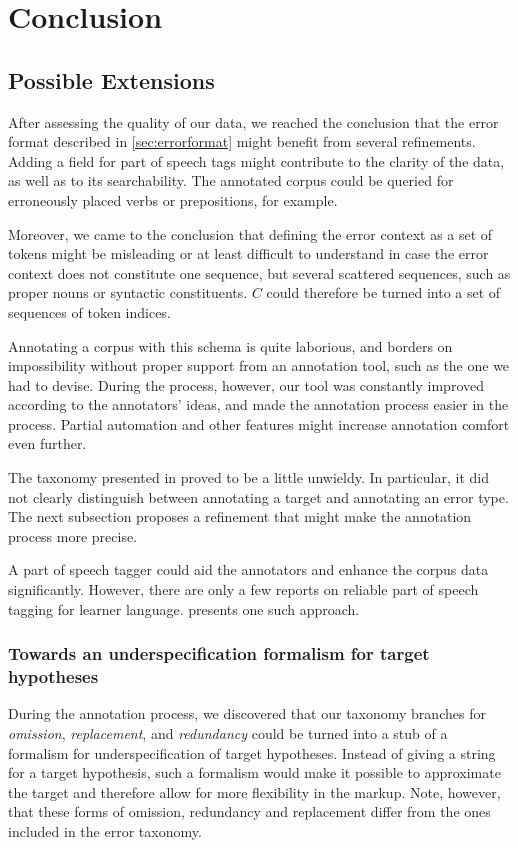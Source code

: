\documentclass[12pt]{article}
\begin{document}
\section{Conclusion}

\subsection{Possible Extensions}

After assessing the quality of our data, we reached
the conclusion that the error format described in \ref{sec:errorformat}
might benefit from several refinements. Adding a field for part of speech tags
might contribute to the clarity of the data, as well as to its searchability.
The annotated corpus could be queried for erroneously placed verbs or
prepositions, for example.

Moreover, we came to the conclusion that defining the error context as a set of
tokens might be misleading or at least difficult to understand in case the error
context does not constitute one sequence, but several scattered sequences, such
as proper nouns or syntactic constituents. $C$ could therefore be turned into a
set of sequences of token indices.

Annotating a corpus with this schema is quite laborious, and borders on
impossibility without proper support from an annotation tool, such as the one we
had to devise. During the process, however, our tool was constantly improved
according to the annotators' ideas, and made the annotation process easier in
the process. Partial automation and other features might increase annotation
comfort even further.

The taxonomy presented in \label{taxonomy} proved to be a little unwieldy. In
particular, it did not clearly distinguish between annotating a target and
annotating an error type. The next subsection proposes a refinement that might
make the annotation process more precise.

A part of speech tagger could aid the annotators and enhance the corpus data
significantly. However, there are only a few reports on reliable part of speech
tagging for learner language. \cite{luedeling} presents one such approach.

\subsubsection{Towards an underspecification formalism for target hypotheses}

During the annotation process, we discovered that our taxonomy branches for
\textit{omission}, \textit{replacement}, and \textit{redundancy} could be turned
into a stub of a formalism for underspecification of target hypotheses. Instead
of giving a string for a target hypothesis, such a formalism would make it
possible to approximate the target and therefore allow for more flexibility in
the markup. Note, however, that these forms of omission, redundancy and
replacement differ from the ones included in the error taxonomy.
\end{document}
